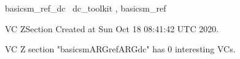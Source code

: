 \documentclass{article}
\begin{document}

\begin{zsection}	 \SECTION basicsm\_ref\_dc \parents~dc\_toolkit , basicsm\_ref
\end{zsection}

\newcommand{\appliesTo}{\zbinop{appliesTo}} 
\newcommand{\appliesToNofix}{\zpreop{appliesToNofix}} 

VC ZSection Created at Sun Oct 18 08:41:42 UTC 2020.



 VC Z section "basicsmARGrefARGdc" has $0$ interesting VCs.



\end{document}
